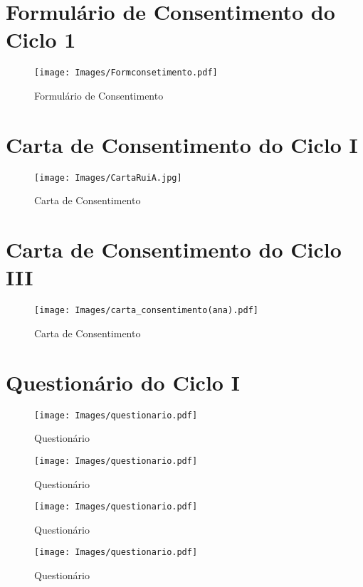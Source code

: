 \chapter{ Formulário de Consentimento do Ciclo 1}

\begin{figure}[H]
    \centering
    \texttt{[image: Images/Formconsetimento.pdf]}
    \caption{Formulário de Consentimento}
    \label{fig:formconset}
\end{figure}


\chapter{ Carta de Consentimento do Ciclo I}

\begin{figure}[H]
    \centering
    \texttt{[image: Images/CartaRuiA.jpg]}
    \caption{Carta de Consentimento}
    \label{fig:cartaconsent}
\end{figure}

\chapter{ Carta de Consentimento do Ciclo III}

\begin{figure}[H]
    \centering
    \texttt{[image: Images/carta\_consentimento(ana).pdf]}
    \caption{Carta de Consentimento}
    \label{fig:cartaconsentimento}
\end{figure}

\chapter{ Questionário do Ciclo I}

\begin{figure}[H]
    \centering
    \texttt{[image: Images/questionario.pdf]}
    \caption{Questionário}
    \label{fig:quest1}
\end{figure}

\begin{figure}[H]
    \centering
    \texttt{[image: Images/questionario.pdf]}
    \caption{Questionário}
    \label{fig:quest2}
\end{figure}

\begin{figure}[H]
    \centering
    \texttt{[image: Images/questionario.pdf]}
    \caption{Questionário}
    \label{fig:quest3}
\end{figure}

\begin{figure}[H]
    \centering
    \texttt{[image: Images/questionario.pdf]}
    \caption{Questionário}
    \label{fig:quest4}
\end{figure}